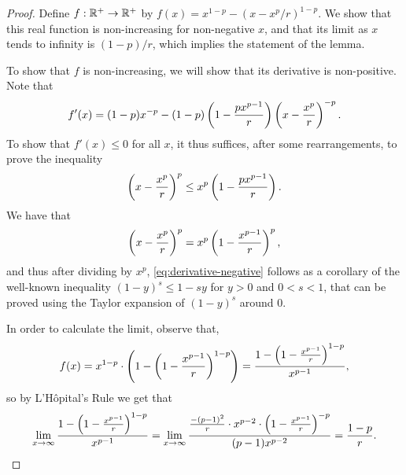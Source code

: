 \documentclass[11pt]{article}
\begin{document}
\begin{proof}
Define $f:\R^+ \to \R^+$ by $f(x) = x^{1-p} - (x-x^p/r)^{1-p}$. We show that this real function is non-increasing for non-negative $x$, and that its limit as $x$ tends to infinity is $(1-p)/r$, which implies the statement of the lemma.

To show that $f$ is non-increasing, we will show that its derivative is non-positive. Note that 
\[
f'(x) = (1-p)x^{-p} - (1-p) \left( 1-\frac{px^{p-1}}{r} \right) \left( x-\frac{x^p}{r} \right)^{-p}.
\]
To show that $f'(x) \le 0$ for all $x$, it thus suffices, after some rearrangements, to prove the inequality
\begin{equation}
\label{eq:derivative-negative}
\left( x-\frac{x^p}{r} \right)^{p} \le x^{p} \left( 1-\frac{px^{p-1}}{r} \right).
\end{equation}
We have that
\[
\left( x-\frac{x^p}{r} \right)^{p} = x^p \left( 1-\frac{x^{p-1}}{r} \right)^p,
\]
and thus after dividing by $x^p$, \eqref{eq:derivative-negative} follows as a corollary of the well-known inequality $(1-y)^s \le 1-sy$ for $y>0$ and $0 < s < 1$, that can be proved using the Taylor expansion of $(1-y)^s$ around $0$.

In order to calculate the limit, observe that,
\[
f(x) = x^{1-p} \cdot \left(  1-\left( 1-\frac{x^{p-1}}{r} \right)^{1-p}  \right) =  \frac{1-\left( 1-\frac{x^{p-1}}{r}  \right)^{1-p}} {x^{p-1}},
\]
so by L'H\^{o}pital's Rule we get that
\[
\lim_{x \to \infty} \frac{1-\left( 1-\frac{x^{p-1}}{r}  \right)^{1-p}} {x^{p-1}}=
\lim_{x \to \infty} \frac{\frac{-(p-1)^2}{r} \cdot x^{p-2} \cdot \left( 1-\frac{x^{p-1}}{r} \right)^{-p}} {(p-1)x^{p-2}} = \frac{1-p}{r}. \qedhere
\]
\end{proof}
\end{document}
